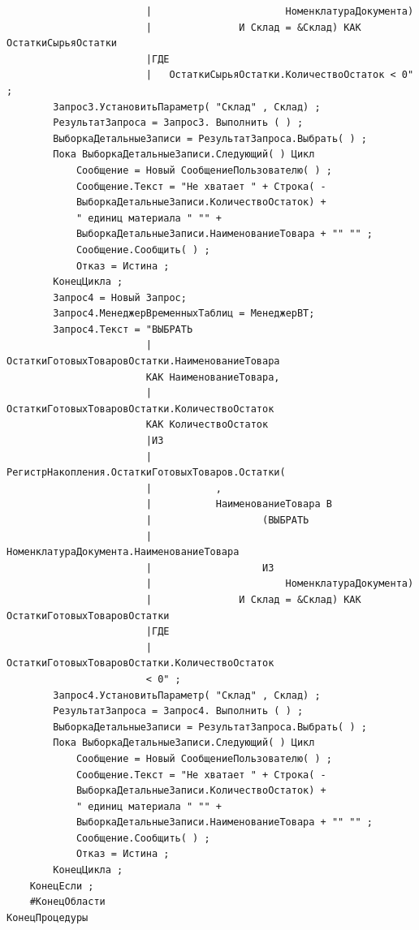 \documentclass[12pt,a4paper]{article}
\begin{document}
\begin{appendices}
\begin{verbatim}
                        |						НоменклатураДокумента)
                        |				И Склад = &Склад) КАК ОстаткиСырьяОстатки
                        |ГДЕ
                        |	ОстаткиСырьяОстатки.КоличествоОстаток < 0" ;
        Запрос3.УстановитьПараметр( "Склад" , Склад) ;
        РезультатЗапроса = Запрос3. Выполнить ( ) ;
        ВыборкаДетальныеЗаписи = РезультатЗапроса.Выбрать( ) ;
        Пока ВыборкаДетальныеЗаписи.Следующий( ) Цикл
            Сообщение = Новый СообщениеПользователю( ) ;
            Сообщение.Текст = "Не хватает " + Строка( -
            ВыборкаДетальныеЗаписи.КоличествоОстаток) +
            " единиц материала " "" +
            ВыборкаДетальныеЗаписи.НаименованиеТовара + "" "" ;
            Сообщение.Сообщить( ) ;
            Отказ = Истина ;
        КонецЦикла ;
        Запрос4 = Новый Запрос;
        Запрос4.МенеджерВременныхТаблиц = МенеджерВТ;
        Запрос4.Текст = "ВЫБРАТЬ
                        |	ОстаткиГотовыхТоваровОстатки.НаименованиеТовара
                        КАК НаименованиеТовара,
                        |	ОстаткиГотовыхТоваровОстатки.КоличествоОстаток
                        КАК КоличествоОстаток
                        |ИЗ
                        |	РегистрНакопления.ОстаткиГотовыхТоваров.Остатки(
                        |			,
                        |			НаименованиеТовара В
                        |					(ВЫБРАТЬ
                        |						НоменклатураДокумента.НаименованиеТовара
                        |					ИЗ
                        |						НоменклатураДокумента)
                        |				И Склад = &Склад) КАК ОстаткиГотовыхТоваровОстатки
                        |ГДЕ
                        |	ОстаткиГотовыхТоваровОстатки.КоличествоОстаток
                        < 0" ;
        Запрос4.УстановитьПараметр( "Склад" , Склад) ;
        РезультатЗапроса = Запрос4. Выполнить ( ) ;
        ВыборкаДетальныеЗаписи = РезультатЗапроса.Выбрать( ) ;
        Пока ВыборкаДетальныеЗаписи.Следующий( ) Цикл
            Сообщение = Новый СообщениеПользователю( ) ;
            Сообщение.Текст = "Не хватает " + Строка( -
            ВыборкаДетальныеЗаписи.КоличествоОстаток) +
            " единиц материала " "" +
            ВыборкаДетальныеЗаписи.НаименованиеТовара + "" "" ;
            Сообщение.Сообщить( ) ;
            Отказ = Истина ;
        КонецЦикла ;
    КонецЕсли ; 
    #КонецОбласти
КонецПроцедуры
\end{verbatim}

\begin{lstlisting}[caption=ОбработкаПроведения из модуля  объекта Накладной на продажу]
\end{lstlisting}


\end{appendices}
\end{document}
